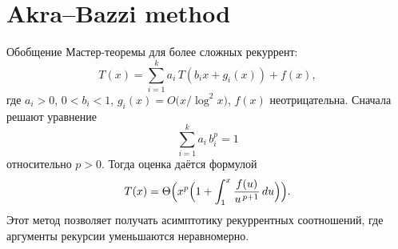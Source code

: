 \documentclass{article}
\begin{document}
	\section{Akra–Bazzi method}
	Обобщение Мастер-теоремы для более сложных рекуррент:
	\[
	T(x) = \sum_{i=1}^k a_i\,T(b_i x + g_i(x)) + f(x),
	\]
	где $a_i>0$, $0<b_i<1$, $g_i(x)=O\bigl(x/\log^2 x\bigr)$, $f(x)$ неотрицательна. Сначала решают уравнение 
	\[
	\sum_{i=1}^k a_i\,b_i^p = 1
	\]
	относительно $p>0$. Тогда оценка даётся формулой
	\[
	T(x) = \Theta\Bigl(x^p\Bigl(1 + \int_1^x \frac{f(u)}{u^{\,p+1}}\,du\Bigr)\Bigr).
	\]
	Этот метод позволяет получать асимптотику рекуррентных соотношений, где аргументы рекурсии уменьшаются неравномерно.
	
	
	
\end{document}
